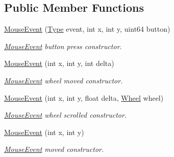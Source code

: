 \subsection*{Public Member Functions}
\begin{DoxyCompactItemize}
\item 
\mbox{\label{class_arcana_1_1_mouse_event_a69650ca386ade5d366d05671c4be3780}} 
\mbox{\hyperlink{class_arcana_1_1_mouse_event_a69650ca386ade5d366d05671c4be3780}{Mouse\+Event}} (\mbox{\hyperlink{class_arcana_1_1_mouse_event_aef6393d6d26e822bd527617c64acadea}{Type}} event, int x, int y, uint64 button)
\begin{DoxyCompactList}\small\item\em \mbox{\hyperlink{class_arcana_1_1_mouse_event}{Mouse\+Event}} button press constructor. \end{DoxyCompactList}\item 
\mbox{\label{class_arcana_1_1_mouse_event_ad66da4ca5b708d640f5fc13b620b0d15}} 
\mbox{\hyperlink{class_arcana_1_1_mouse_event_ad66da4ca5b708d640f5fc13b620b0d15}{Mouse\+Event}} (int x, int y, int delta)
\begin{DoxyCompactList}\small\item\em \mbox{\hyperlink{class_arcana_1_1_mouse_event}{Mouse\+Event}} wheel moved constructor. \end{DoxyCompactList}\item 
\mbox{\label{class_arcana_1_1_mouse_event_af578af2045606d94736d2f59be861a37}} 
\mbox{\hyperlink{class_arcana_1_1_mouse_event_af578af2045606d94736d2f59be861a37}{Mouse\+Event}} (int x, int y, float delta, \mbox{\hyperlink{class_arcana_1_1_mouse_event_aa658cf03c3ae261e9552804c0e0a46dd}{Wheel}} wheel)
\begin{DoxyCompactList}\small\item\em \mbox{\hyperlink{class_arcana_1_1_mouse_event}{Mouse\+Event}} wheel scrolled constructor. \end{DoxyCompactList}\item 
\mbox{\label{class_arcana_1_1_mouse_event_ac249939756a1158fbe5897bf7760dfa4}} 
\mbox{\hyperlink{class_arcana_1_1_mouse_event_ac249939756a1158fbe5897bf7760dfa4}{Mouse\+Event}} (int x, int y)
\begin{DoxyCompactList}\small\item\em \mbox{\hyperlink{class_arcana_1_1_mouse_event}{Mouse\+Event}} moved constructor. \end{DoxyCompactList}\item 

\end{DoxyCompactItemize}
